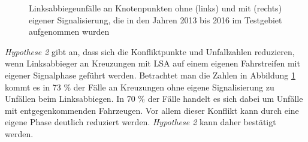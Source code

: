 \begin{savenotes}
	\begin{figure} [H]
		\caption[Linksabbiegeunfälle an Knotenpunkten ohne (links) und mit (rechts) eigener Signalisierung, die in den Jahren 2013 bis 2016 im Testgebiet aufgenommen wurden]{Linksabbiegeunfälle an Knotenpunkten ohne (links) und mit (rechts) eigener Signalisierung, die in den Jahren 2013 bis 2016 im Testgebiet aufgenommen wurden}\label{fig:Unfaelle_Signalphasen} 
	\end{figure}
\end{savenotes}

\textit{Hypothese 2} gibt an, dass sich die Konfliktpunkte und Unfallzahlen reduzieren, wenn Linksabbieger an Kreuzungen mit \ac{LSA} auf einem eigenen Fahrstreifen mit eigener Signalphase geführt werden. Betrachtet man die Zahlen in Abbildung \ref{fig:Unfaelle_Signalphasen} kommt es in 73 \% der Fälle an Kreuzungen ohne eigene Signalisierung zu Unfällen beim Linksabbiegen. In 70 \%  der Fälle handelt es sich dabei um Unfälle mit entgegenkommenden Fahrzeugen. Vor allem dieser Konflikt kann durch eine eigene Phase deutlich reduziert werden. \textit{Hypothese 2} kann daher bestätigt werden.

